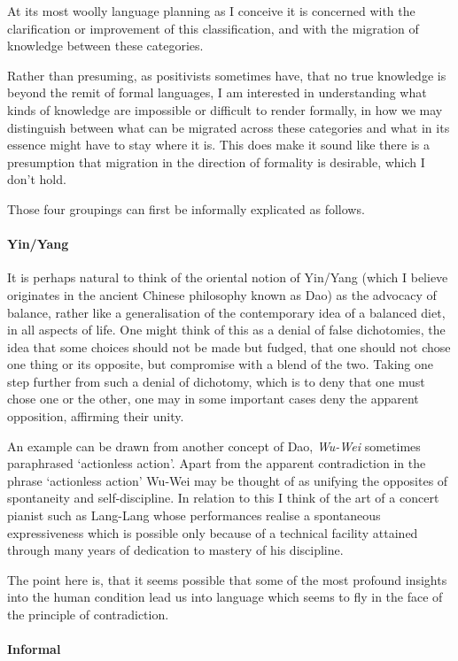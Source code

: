 \documentclass[numreferences]{rbjk}
\begin{document}
\begin{article}
At its most woolly language planning as I conceive it is concerned with the clarification or improvement of this classification, and with the migration of knowledge between these categories.

Rather than presuming, as positivists sometimes have, that no true knowledge is beyond the remit of formal languages, I am interested in understanding what kinds of knowledge are impossible or difficult to render formally, in how we may distinguish between what can be migrated across these categories and what in its essence might have to stay where it is.
This does make it sound like there is a presumption that migration in the direction of formality is desirable, which I don't hold.

Those four groupings can first be informally explicated as follows.

\paragraph{Yin/Yang}
It is perhaps natural to think of the oriental notion of Yin/Yang (which I believe originates in the ancient Chinese philosophy known as Dao) as the advocacy of balance, rather like a generalisation of the contemporary idea of a balanced diet, in all aspects of life.
One might think of this as a denial of false dichotomies, the idea that some choices should not be made but fudged, that one should not chose one thing or its opposite, but compromise with a blend of the two.
Taking one step further from such a denial of dichotomy, which is to deny that one must chose one or the other, one may in some important cases deny the apparent opposition, affirming their unity.

An example can be drawn from another concept of Dao, \emph{Wu-Wei} sometimes paraphrased `actionless action'.
Apart from the apparent contradiction in the phrase `actionless action' Wu-Wei may be thought of as unifying the opposites of spontaneity and self-discipline.
In relation to this I think of the art of a concert pianist such as Lang-Lang whose performances realise a spontaneous expressiveness which is possible only because of a technical facility attained through many years of dedication to mastery of his discipline.

The point here is, that it seems possible that some of the most profound insights into the human condition lead us into language which seems to fly in the face of the principle of contradiction.

\paragraph{Informal}


\end{article}
\end{document}
